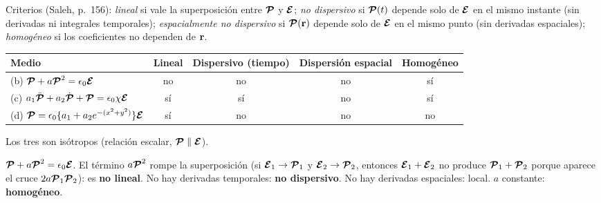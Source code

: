 
\label{sol:2}

Criterios (Saleh, p.~156): \emph{lineal} si vale la superposición entre $\Pc$ y $\Ec$;
\emph{no dispersivo} si $\Pc(t)$ depende solo de $\Ec$ en el mismo instante (sin derivadas ni
integrales temporales); \emph{espacialmente no dispersivo} si $\Pc(\rv)$ depende solo de $\Ec$ en el mismo
punto (sin derivadas espaciales); \emph{homogéneo} si los coeficientes no dependen de $\rv$.

\begin{center}
\begin{tabular}{@{}lcccc@{}}\toprule
Medio & Lineal & Dispersivo (tiempo) & Dispersión espacial & Homogéneo\\\midrule
(b) $\Pc+a\Pc^2=\epsilon_0\Ec$ & no & no & no & sí\\
(c) $a_1\ddot{\Pc}+a_2\dot{\Pc}+\Pc=\epsilon_0\chi\Ec$ & sí & sí & no & sí\\
(d) $\Pc=\epsilon_0\{a_1+a_2e^{-(x^2+y^2)}\}\Ec$ & sí & no & no & no\\\bottomrule
\end{tabular}
\end{center}
Los tres son isótropos (relación escalar, $\Pc\parallel\Ec$).

 $\Pc+a\Pc^2=\epsilon_0\Ec$. El término $a\Pc^2$ rompe la superposición (si $\Ec_1\to\Pc_1$ y
$\Ec_2\to\Pc_2$, entonces $\Ec_1+\Ec_2$ no produce $\Pc_1+\Pc_2$ porque aparece el cruce
$2a\Pc_1\Pc_2$): es \textbf{no lineal}. No hay derivadas temporales: \textbf{no dispersivo}. No hay
derivadas espaciales: local. $a$ constante: \textbf{homogéneo}.

